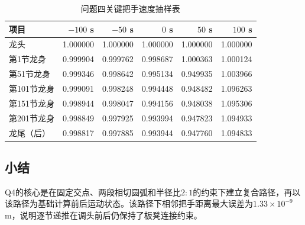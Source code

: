 \begin{table}[H]
\centering
\caption{问题四关键把手速度抽样表}
\label{tab:q4-speed-extract}
\begingroup
\setlength{\tabcolsep}{3pt}
\begin{tabularx}{\textwidth}{>{\raggedright\arraybackslash}p{}*{5}{R}}
\toprule
项目 & $-100$ s & $-50$ s & $0$ s & $50$ s & $100$ s\\
\midrule
龙头 & 1.000000 & 1.000000 & 1.000000 & 1.000000 & 1.000000\\
第1节龙身 & 0.999904 & 0.999762 & 0.998687 & 1.000363 & 1.000124\\
第51节龙身 & 0.999346 & 0.998642 & 0.995134 & 0.949935 & 1.003966\\
第101节龙身 & 0.999091 & 0.998248 & 0.994448 & 0.948482 & 1.096263\\
第151节龙身 & 0.998944 & 0.998047 & 0.994156 & 0.948038 & 1.095306\\
第201节龙身 & 0.998849 & 0.997925 & 0.993994 & 0.947823 & 1.094933\\
龙尾（后） & 0.998817 & 0.997885 & 0.993944 & 0.947760 & 1.094833\\
\bottomrule
\end{tabularx}
\endgroup
\end{table}

\subsection{小结}
Q4的核心是在固定交点、两段相切圆弧和半径比$2:1$的约束下建立复合路径，再以该路径为基础计算前后运动状态。该路径下相邻把手距离最大误差为$1.33\times10^{-9}$ m，说明逐节递推在调头前后仍保持了板凳连接约束。
